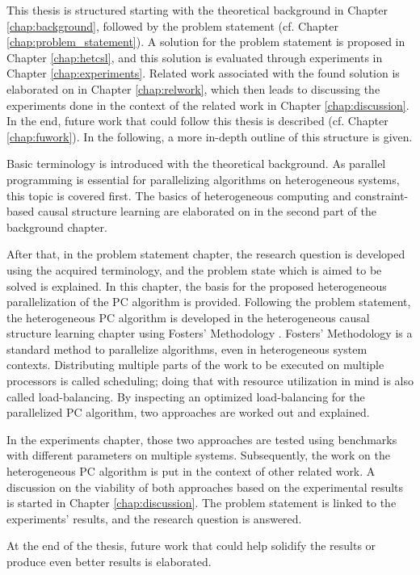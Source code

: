 This thesis is structured starting with the theoretical background in Chapter \ref{chap:background}, followed by the problem statement (cf. Chapter \ref{chap:problem_statement}). A solution for the problem statement is proposed in Chapter \ref{chap:hetcsl}, and this solution is evaluated through experiments in Chapter \ref{chap:experiments}. Related work associated with the found solution is elaborated on in Chapter \ref{chap:relwork}, which then leads to discussing the experiments done in the context of the related work in Chapter \ref{chap:discussion}. In the end, future work that could follow this thesis is described (cf. Chapter \ref{chap:fuwork}). In the following, a more in-depth outline of this structure is given.

Basic terminology is introduced with the theoretical background. As parallel programming is essential for parallelizing algorithms on heterogeneous systems, this topic is covered first. The basics of heterogeneous computing and constraint-based causal structure learning are elaborated on in the second part of the background chapter.

After that, in the problem statement chapter, the research question is developed using the acquired terminology, and the problem state which is aimed to be solved is explained. In this chapter, the basis for the proposed heterogeneous parallelization of the PC algorithm is provided. Following the problem statement, the heterogeneous PC algorithm is developed in the heterogeneous causal structure learning chapter using Fosters' Methodology \cite{fosterDesigningBuildingParallel1995}. Fosters' Methodology is a standard method to parallelize algorithms, even in heterogeneous system contexts. Distributing multiple parts of the work to be executed on multiple processors is called scheduling; doing that with resource utilization in mind is also called load-balancing. By inspecting an optimized load-balancing for the parallelized PC algorithm, two approaches are worked out and explained.

In the experiments chapter, those two approaches are tested using benchmarks with different parameters on multiple systems. Subsequently, the work on the heterogeneous PC algorithm is put in the context of other related work. A discussion on the viability of both approaches based on the experimental results is started in Chapter \ref{chap:discussion}. The problem statement is linked to the experiments' results, and the research question is answered.

At the end of the thesis, future work that could help solidify the results or produce even better results is elaborated.

